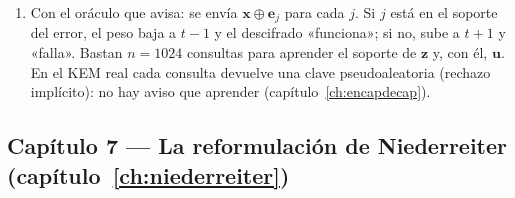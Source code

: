 \documentclass[11pt,a4paper,oneside]{report}
\newcommand{\ve}{\mathbf{e}}
\newcommand{\vx}{\mathbf{x}}
\newcommand{\vu}{\mathbf{u}}
\newcommand{\vz}{\mathbf{z}}
\begin{document}
\begin{enumerate}[leftmargin=1.9em,itemsep=4pt]
        estructurada (los códigos de Goppa); (b)~para $n=3488$ fijo
        no acota nada concreto; (c)~y la seguridad del esquema es una
        conjetura de dureza \emph{en media} sobre su distribución
        (capítulo~\ref{ch:seguridad}).
  \item Con el oráculo que avisa: se envía $\vx\oplus\ve_j$ para cada
        $j$. Si $j$ está en el soporte del error, el peso baja a
        $t-1$ y el descifrado «funciona»; si no, sube a $t+1$ y
        «falla». Bastan $n=1024$ consultas para aprender el soporte
        de $\vz$ y, con él, $\vu$. En el KEM real cada consulta
        devuelve una clave pseudoaleatoria (rechazo implícito): no
        hay aviso que aprender (capítulo~\ref{ch:encapdecap}).
\end{enumerate}

\subsection*{Capítulo 7 --- La reformulación de Niederreiter
(capítulo~\ref{ch:niederreiter})}
\end{document}

